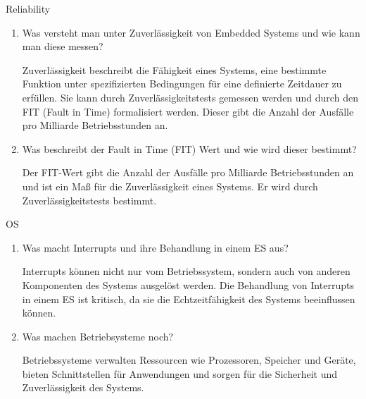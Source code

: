 \documentclass{article}
\begin{document}
\begin{exercise}{Reliability}
  \begin{enumerate}
    \item Was versteht man unter Zuverlässigkeit von Embedded Systems und wie kann man diese messen?

          \begin{solution}
            Zuverlässigkeit beschreibt die Fähigkeit eines Systems, eine bestimmte Funktion unter spezifizierten Bedingungen für eine definierte Zeitdauer zu erfüllen. Sie kann durch Zuverlässigkeitstests gemessen werden und durch den FIT (Fault in Time) formalisiert werden. Dieser gibt die Anzahl der Ausfälle pro Milliarde Betriebsstunden an.
          \end{solution}
    \item Was beschreibt der Fault in Time (FIT) Wert und wie wird dieser bestimmt?

          \begin{solution}
            Der FIT-Wert gibt die Anzahl der Ausfälle pro Milliarde Betriebsstunden an und ist ein Maß für die Zuverlässigkeit eines Systems. Er wird durch Zuverlässigkeitstests bestimmt.
          \end{solution}
  \end{enumerate}
\end{exercise}

\begin{exercise}{OS}
  \begin{enumerate}
    \item Was macht Interrupts und ihre Behandlung in einem ES aus?

          \begin{solution}
            Interrupts können nicht nur vom Betriebssystem, sondern auch von anderen Komponenten des Systems ausgelöst werden. Die Behandlung von Interrupts in einem ES ist kritisch, da sie die Echtzeitfähigkeit des Systems beeinflussen können.
          \end{solution}

    \item Was machen Betriebsysteme noch?

          \begin{solution}
            Betriebssysteme verwalten Ressourcen wie Prozessoren, Speicher und Geräte, bieten Schnittstellen für Anwendungen und sorgen für die Sicherheit und Zuverlässigkeit des Systems.
          \end{solution}
  \end{enumerate}
\end{exercise}
\end{document}
